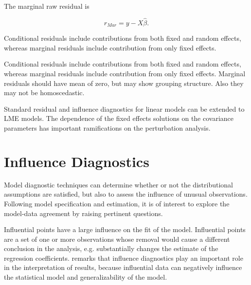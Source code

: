 \documentclass[12pt, a4paper]{report}
\theoremstyle{definition}
\theoremstyle{remark}
\begin{document}
The marginal raw residual is

\[ r_{Mar} = y - X \hat{\beta}. \]

Conditional residuals include contributions from both fixed and random effects, whereas marginal residuals include contribution from only fixed effects.



%
%

Conditional residuals include contributions from both fixed and random effects, whereas marginal residuals include contribution from only fixed effects. Marginal residuals should have mean of zero, but may show grouping structure. Also they may not be homoscedastic.


Standard residual and influence diagnostics for linear models can be extended to LME models. The dependence of the fixed effects solutions on the covariance parameters has important ramifications on the perturbation analysis. 

\section{Influence Diagnostics}

Model diagnostic techniques can determine whether or not the distributional assumptions are satisfied, but also to assess the influence of unusual observations. Following model specification and estimation, it is of interest to explore the model-data agreement by raising pertinent questions. 

Influential points have a large influence on the fit of the model. Influential points are a set of one or more observations whose removal would cause a different conclusion in the analysis, e.g. substantially changes the estimate of the regression coefficients. \citet{west} remarks that influence diagnostics play an important role in the interpretation of results, because influential data can negatively influence the statistical model and generalizability of the model. 


\end{document}
